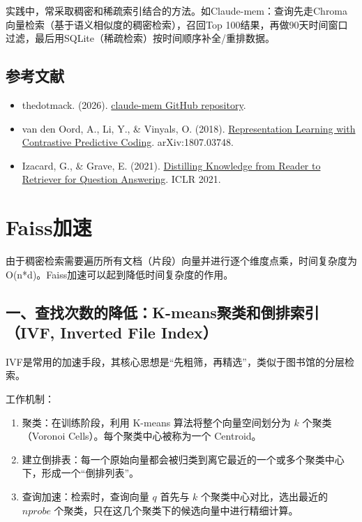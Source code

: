 实践中，常采取稠密和稀疏索引结合的方法。如Claude-mem：查询先走Chroma向量检索（基于语义相似度的稠密检索），召回Top 100结果，再做90天时间窗口过滤，最后用SQLite（稀疏检索）按时间顺序补全/重排数据。

\hypertarget{ux53c2ux8003ux6587ux732e-130}{%
\subsection{参考文献}\label{ux53c2ux8003ux6587ux732e-130}}

\begin{itemize}
\tightlist
\item
  thedotmack. (2026). \href{https://github.com/thedotmack/claude-mem}{claude-mem GitHub repository}.
\item
  van den Oord, A., Li, Y., \& Vinyals, O. (2018). \href{https://arxiv.org/abs/1807.03748}{Representation Learning with Contrastive Predictive Coding}. arXiv:1807.03748.
\item
  Izacard, G., \& Grave, E. (2021). \href{https://arxiv.org/abs/2012.04584}{Distilling Knowledge from Reader to Retriever for Question Answering}. ICLR 2021.
\end{itemize}

\clearpage

\hypertarget{faissux52a0ux901f}{%
\section{Faiss加速}\label{faissux52a0ux901f}}

由于稠密检索需要遍历所有文档（片段）向量并进行逐个维度点乘，时间复杂度为O(n*d)。Faiss加速可以起到降低时间复杂度的作用。

\hypertarget{ux4e00ux67e5ux627eux6b21ux6570ux7684ux964dux4f4ek-meansux805aux7c7bux548cux5012ux6392ux7d22ux5f15ivf-inverted-file-index}{%
\subsection{一、查找次数的降低：K-means聚类和倒排索引（IVF, Inverted File Index）}\label{ux4e00ux67e5ux627eux6b21ux6570ux7684ux964dux4f4ek-meansux805aux7c7bux548cux5012ux6392ux7d22ux5f15ivf-inverted-file-index}}

IVF是常用的加速手段，其核心思想是``先粗筛，再精选''，类似于图书馆的分层检索。

工作机制：

\begin{enumerate}
\def\labelenumi{\arabic{enumi}.}
\item
  聚类：在训练阶段，利用 K-means 算法将整个向量空间划分为 \(k\) 个聚类（Voronoi Cells）。每个聚类中心被称为一个 Centroid。
\item
  建立倒排表：每一个原始向量都会被归类到离它最近的一个或多个聚类中心下，形成一个``倒排列表''。
\item
  查询加速：检索时，查询向量 \(q\) 首先与 \(k\) 个聚类中心对比，选出最近的 \(nprobe\) 个聚类，只在这几个聚类下的候选向量中进行精细计算。
\end{enumerate}

